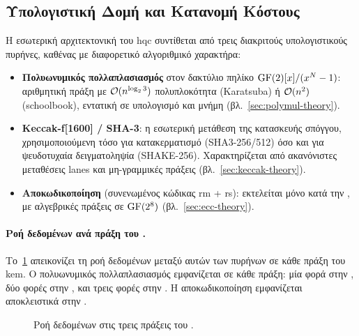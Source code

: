 \begin{table}[htbp]
  \centering
  \caption{Παράμετροι ασφαλείας του \HQC ανά security level.}
  \label{tab:hqc-params}
  
\end{table}


\subsection{Υπολογιστική Δομή και Κατανομή Κόστους}
\label{sec:hqc-cost-distribution}

Η εσωτερική αρχιτεκτονική του \gls{hqc} συντίθεται από τρεις διακριτούς υπολογιστικούς
πυρήνες, καθένας με διαφορετικό αλγοριθμικό χαρακτήρα:
\begin{itemize}
  \item \textbf{Πολυωνυμικός πολλαπλασιασμός} στον δακτύλιο πηλίκο $\mathrm{GF}(2)[x]/(x^{N}-1)$: αριθμητική
    πράξη με $\mathcal{O}(n^{\log_2 3})$ πολυπλοκότητα (Karatsuba) ή $\mathcal{O}(n^2)$
    (schoolbook), εντατική σε υπολογισμό και μνήμη (βλ.\ \cref{sec:polymul-theory}).
  \item \textbf{Keccak-f[1600] / SHA-3}: η εσωτερική μετάθεση της κατασκευής
    σπόγγου, χρησιμοποιούμενη τόσο για κατακερματισμό (SHA3-256/512) όσο και για
    ψευδοτυχαία δειγματοληψία (SHAKE-256). Χαρακτηρίζεται από ακανόνιστες
    μεταθέσεις lanes και μη-γραμμικές πράξεις (βλ.\ \cref{sec:keccak-theory}).
  \item \textbf{Αποκωδικοποίηση} (συνενωμένος κώδικας \gls{rm} + \gls{rs}):
    εκτελείται μόνο κατά την \Decaps, με αλγεβρικές πράξεις σε $\mathrm{GF}(2^8)$
    (βλ.\ \cref{sec:ecc-theory}).
\end{itemize}

\paragraph{Ροή δεδομένων ανά πράξη του \KEM .}
Το~\cref{fig:hqc-dataflow} απεικονίζει τη ροή δεδομένων μεταξύ αυτών των πυρήνων
σε κάθε πράξη του \gls{kem}.
Ο πολυωνυμικός πολλαπλασιασμός εμφανίζεται σε κάθε πράξη: μία φορά
στην \KeyGen, δύο φορές στην \Encaps, και τρεις φορές στην \Decaps.
Η αποκωδικοποίηση εμφανίζεται αποκλειστικά στην \Decaps.

\begin{figure}[htbp]
  \centering
  
  \caption{Ροή δεδομένων στις τρεις \KEM πράξεις του \HQC.}
  \label{fig:hqc-dataflow}
\end{figure}

